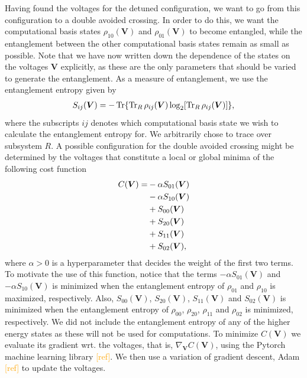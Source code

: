 \documentclass[twocolumn,superscriptaddress,unsortedaddress,
 amsmath,amssymb,
 aps,
]{revtex4-2}
\newcommand{\may}[1]{\textcolor{orange}{#1}}
\begin{document}
        Having found the voltages for the detuned configuration, we want to go from this configuration to a double avoided crossing. In order to do this, we want the computational basis states $\rho_{10}(\boldsymbol{V})$ and $\rho_{01}(\boldsymbol{V})$ to become entangled, while the entanglement between the other computational basis states remain as small as possible. Note that we have now written down the dependence of the states on the voltages $\boldsymbol{V}$ explicitly, as these are the only parameters that should be varied to generate the entanglement. As a measure of entanglement, we use the entanglement entropy given by
        \begin{align*}
            S_{ij}(\boldsymbol{V}) = -\Tr{\Tr_R{\rho_{ij}(\boldsymbol{V})}\log_2[\Tr_R{\rho_{ij}(\boldsymbol{V})]}},
        \end{align*}
        where the subscripts $ij$ denotes which computational basis state we wish to calculate the entanglement entropy for. We arbitrarily chose to trace over subsystem $R$.
        A possible configuration for the double avoided crossing might be determined by the voltages that constitute a local or global minima of the following cost function
        \begin{align*}
            C(\boldsymbol{V}) =& -\alpha S_{01}(\boldsymbol{V}) \notag \\
            &- \alpha S_{10}(\boldsymbol{V}) \notag \\
            &+ S_{00}(\boldsymbol{V}) \notag \\
            &+ S_{20}(\boldsymbol{V}) \notag \\
            &+ S_{11}(\boldsymbol{V}) \notag \\
            &+ S_{02}(\boldsymbol{V}),
        \end{align*}
        where $\alpha > 0$ is a hyperparameter that decides the weight of the first two terms. To motivate the use of this function, notice that the terms $-\alpha S_{01}(\boldsymbol{V})$ and $-\alpha S_{10}(\boldsymbol{V})$ is minimized when the entanglement entropy of $\rho_{01}$ and $\rho_{10}$ is maximized, respectively. Also, $S_{00}(\boldsymbol{V})$, $S_{20}(\boldsymbol{V})$, $S_{11}(\boldsymbol{V})$ and $S_{02}(\boldsymbol{V})$ is minimized when the entanglement entropy of $\rho_{00}$, $\rho_{20}$, $\rho_{11}$ and $\rho_{02}$ is minimized, respectively. We did not include the entanglement entropy of any of the higher energy states as these will not be used for computations. To minimize $C(\boldsymbol{V})$ we evaluate its gradient wrt. the voltages, that is,
        $\nabla_{\boldsymbol{V}}C(\boldsymbol{V})$, using the Pytorch machine learning library \may{[ref]}. We then use a variation of gradient descent, Adam \may{[ref]} to update the voltages.
        
\end{document}
